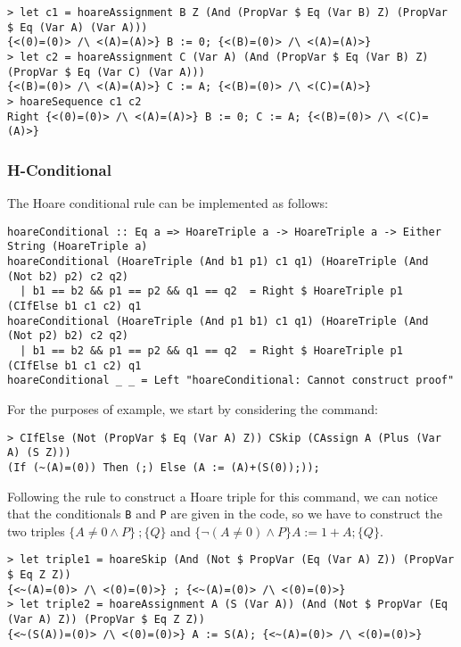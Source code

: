 \documentclass{article}
\begin{document}
\begin{lstlisting}
> let c1 = hoareAssignment B Z (And (PropVar $ Eq (Var B) Z) (PropVar $ Eq (Var A) (Var A)))
{<(0)=(0)> /\ <(A)=(A)>} B := 0; {<(B)=(0)> /\ <(A)=(A)>}
> let c2 = hoareAssignment C (Var A) (And (PropVar $ Eq (Var B) Z) (PropVar $ Eq (Var C) (Var A)))
{<(B)=(0)> /\ <(A)=(A)>} C := A; {<(B)=(0)> /\ <(C)=(A)>}
> hoareSequence c1 c2
Right {<(0)=(0)> /\ <(A)=(A)>} B := 0; C := A; {<(B)=(0)> /\ <(C)=(A)>}
\end{lstlisting}

\subsubsection{H-Conditional}

The Hoare conditional rule can be implemented as follows:

\begin{lstlisting}
hoareConditional :: Eq a => HoareTriple a -> HoareTriple a -> Either String (HoareTriple a)
hoareConditional (HoareTriple (And b1 p1) c1 q1) (HoareTriple (And (Not b2) p2) c2 q2)
  | b1 == b2 && p1 == p2 && q1 == q2  = Right $ HoareTriple p1 (CIfElse b1 c1 c2) q1
hoareConditional (HoareTriple (And p1 b1) c1 q1) (HoareTriple (And (Not p2) b2) c2 q2)
  | b1 == b2 && p1 == p2 && q1 == q2  = Right $ HoareTriple p1 (CIfElse b1 c1 c2) q1
hoareConditional _ _ = Left "hoareConditional: Cannot construct proof"
\end{lstlisting}

For the purposes of example, we start by considering the command:

\begin{lstlisting}
> CIfElse (Not (PropVar $ Eq (Var A) Z)) CSkip (CAssign A (Plus (Var A) (S Z)))
(If (~(A)=(0)) Then (;) Else (A := (A)+(S(0));));
\end{lstlisting}

Following the rule to construct a Hoare triple for this command, we can notice that the conditionals \texttt{B} and \texttt{P} are given in the code, so we have to construct the two triples $\{A \neq 0 \land P\} \ ; \{Q\}$ and $\{\neg(A \neq 0) \land P\} A := 1 + A; \{Q\}$.

\begin{lstlisting}
> let triple1 = hoareSkip (And (Not $ PropVar (Eq (Var A) Z)) (PropVar $ Eq Z Z))
{<~(A)=(0)> /\ <(0)=(0)>} ; {<~(A)=(0)> /\ <(0)=(0)>}
> let triple2 = hoareAssignment A (S (Var A)) (And (Not $ PropVar (Eq (Var A) Z)) (PropVar $ Eq Z Z))
{<~(S(A))=(0)> /\ <(0)=(0)>} A := S(A); {<~(A)=(0)> /\ <(0)=(0)>}
\end{lstlisting}
\end{document}
